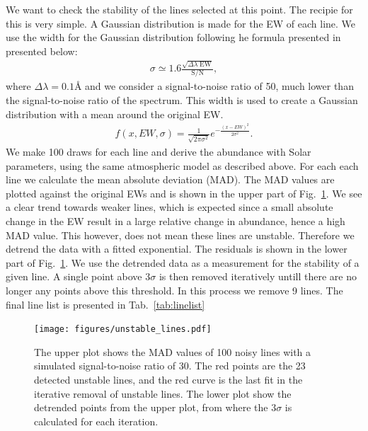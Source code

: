 \documentclass{aa}
\begin{document}
We want to check the stability of the lines selected at this point. The
recipie for this is very simple. A Gaussian distribution is made for the
EW of each line. We use the width for the Gaussian distribution following
he formula presented in \citet{Caryel1988} presented below:
\begin{align}
    \sigma \simeq 1.6 \frac{\sqrt{\Delta\lambda\; \mathrm{EW}}}{\mathrm{S/N}},
\end{align}
where $\Delta\lambda=0.1\si{\angstrom}$ and we consider a
signal-to-noise ratio of 50, much lower than the signal-to-noise ratio
of the spectrum. This width is used to create a Gaussian distribution with
a mean around the original EW.
\begin{align}
    f(x, EW, \sigma) = \frac{1}{\sqrt{2\pi\sigma^2}} e^{-\frac{(x-EW)^2}{2\sigma^2}}.
\end{align}
We make 100 draws for each line and derive the abundance with Solar
parameters, using the same atmospheric model as described above. For
each each line we calculate the mean absolute deviation (MAD). The MAD
values are plotted against the original EWs and is shown in the upper part of
Fig.~\ref{fig:unstable_lines}. We see a clear trend towards weaker lines,
which is expected since a small absolute change in the EW result in a
large relative change in abundance, hence a high MAD value. This however,
does not mean these lines are unstable. Therefore we detrend the data
with a fitted exponential. The residuals is shown in the lower part of
Fig.~\ref{fig:unstable_lines}. We use the detrended data as a measurement
for the stability of a given line. A single point above $3 \sigma$ is
then removed iteratively untill there are no longer any points above
this threshold. In this process we remove 9 lines. The final line list
is presented in Tab.~\ref{tab:linelist}

\begin{figure}[tbp!]
    \centering
    \texttt{[image: figures/unstable\_lines.pdf]}
    \caption{The upper plot shows the MAD values of 100 noisy lines with
    a simulated signal-to-noise ratio of 30. The red points are the 23
    detected unstable lines, and the red curve is the last fit in the
    iterative removal of unstable lines.
    The lower plot show the detrended points from the upper plot, from
    where the $3\sigma$ is calculated for each iteration.}
    \label{fig:unstable_lines}
\end{figure}
\end{document}
